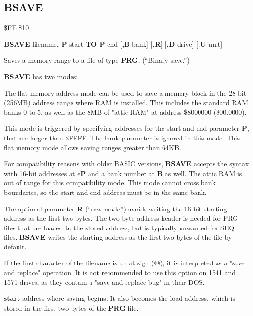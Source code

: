 \subsection{BSAVE}
\begin{description}[leftmargin=2cm,style=nextline]
\item [Token:]    \$FE \$10

\item [Format:]   {\bf BSAVE} filename{\bf, P} start {\bf TO P} end [{\bf,B} bank] [{\bf,R}] [{\bf,D} drive] [{\bf,U} unit]

\item [Usage:]    Saves a memory range to a file of type {\bf PRG}. (``Binary save.'')

                  {\bf BSAVE} has two modes:

                  The flat memory address mode can be used to save a memory block in the 28-bit (256MB) address range where RAM is installed. This includes the standard RAM banks 0 to 5, as well as the 8MB of "attic RAM" at address \$8000000 (800.0000).

                  This mode is triggered by specifying addresses for the start and end parameter {\bf P}, that are larger than \$FFFF. The bank parameter is ignored in this mode. This flat memory mode allows saving ranges greater than 64KB.

                  For compatibility reasons with older BASIC versions, {\bf BSAVE} accepts the syntax with 16-bit addresses at e{\bf P} and a bank number at {\bf B} as well. The attic RAM is out of range for this compatibility mode. This mode cannot cross bank boundaries, so the start and end address must be in the same bank.

                  The optional parameter {\bf R} (``raw mode'') avoids writing the 16-bit starting address as the first two bytes. The two-byte address header is needed for PRG files that are loaded to the stored address, but is typically unwanted for SEQ files. {\bf BSAVE} writes the starting address as the first two bytes of the file by default.

                  \filenamedefinition

                  If the first character of the filename is an at sign ({\bf @}), it is interpreted as a "save and replace" operation. It is not recommended to use this option on 1541 and 1571 drives, as they contain a "save and replace bug" in their DOS.

                  {\bf start} address where saving begins. It also becomes the load address, which is stored in the first two bytes of the {\bf PRG} file.


\end{description}
